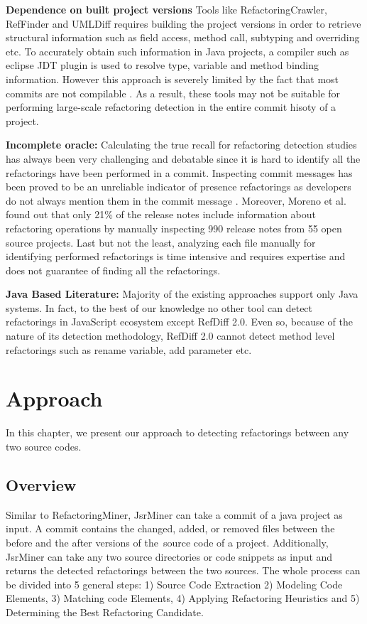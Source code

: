 \documentclass[letterpaper,12pt,onecolumn,final]{report}
\begin{document}
\textbf{Dependence on built project versions} Tools like RefactoringCrawler, RefFinder and UMLDiff requires building the project versions in order to retrieve structural information such as field access, method call, subtyping and overriding etc. To accurately obtain such information in Java projects, a compiler such as eclipse JDT plugin is used to resolve type, variable and method binding information. However this approach is severely limited by the fact that most commits are not compilable \cite{Tufano2017}. As a result, these tools may not be suitable for performing large-scale refactoring detection in the entire commit hisoty of a project.

\textbf{Incomplete oracle:} Calculating the true recall for refactoring detection studies has always been very challenging and debatable since it is hard to identify all the refactorings have been performed in a commit. Inspecting commit messages has been proved to be an unreliable indicator of presence refactorings as developers do not always mention them in the commit message \cite{MurphyHill2012}. Moreover, Moreno et al. \cite{laura2017arena} found out that only 21\% of the release notes include information about refactoring operations by manually inspecting 990 release notes from 55 open source projects. Last but not the least, analyzing each file manually for identifying performed refactorings is time intensive and requires expertise and does not guarantee of finding all the refactorings. 

\textbf{Java Based Literature:} Majority of the existing approaches support only Java systems. In fact, to the best of our knowledge no other tool can detect refactorings in JavaScript ecosystem except RefDiff 2.0. Even so, because of the nature of its detection methodology, RefDiff 2.0 cannot detect method level refactorings such as rename variable, add parameter etc.

\chapter{Approach}

In this chapter, we present our approach to detecting refactorings between any two source codes.

\section *{Overview}

Similar to RefactoringMiner, JsrMiner can take a commit of a java project as input. A commit contains the changed, added, or removed files between the before and the after versions of the source code of a project. Additionally, JsrMiner can take any two source directories or code snippets as input and returns the detected refactorings between the two sources. The whole process can be divided into 5 general steps: 1) Source Code Extraction 2) Modeling Code Elements, 3) Matching code Elements, 4) Applying Refactoring Heuristics and 5) Determining the Best Refactoring Candidate.
\end{document}
